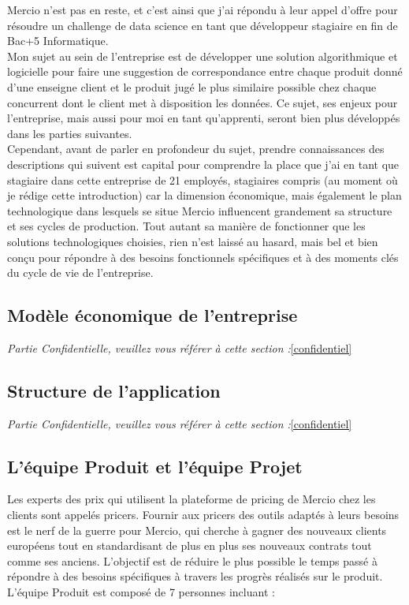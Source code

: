 \documentclass{rapportCS}
\begin{document}
Mercio n'est pas en reste, et c'est ainsi que j'ai répondu à leur appel
d'offre pour résoudre un challenge de data science en tant que développeur stagiaire en fin de 
Bac+5 Informatique.\\
Mon sujet au sein de l'entreprise est de développer une solution algorithmique et logicielle pour 
faire une suggestion de correspondance entre chaque produit donné d'une enseigne client et le 
produit jugé le plus similaire possible chez chaque concurrent 
dont le client met à disposition les données. 
Ce sujet, ses enjeux pour l'entreprise, mais aussi pour moi en tant qu'apprenti,
seront bien plus développés dans les parties suivantes.\\
Cependant, avant de parler en profondeur du sujet, prendre connaissances des descriptions qui
suivent est capital pour comprendre la place que j'ai en tant que stagiaire dans cette 
entreprise de 21 employés, stagiaires compris (au moment où je rédige cette introduction) car la
dimension économique, mais également le plan technologique dans lesquels se situe Mercio influencent 
grandement sa structure et ses cycles de production. Tout autant sa manière de fonctionner que les 
solutions technologiques choisies, rien n'est laissé au hasard, mais bel et bien conçu pour 
répondre à des besoins fonctionnels spécifiques et à des moments clés du cycle de vie de 
l'entreprise.

\subsection{Modèle économique de l'entreprise}
\emph{Partie Confidentielle, veuillez vous référer à cette section :}\ref{confidentiel}

\subsection{Structure de l'application}
\emph{Partie Confidentielle, veuillez vous référer à cette section :}\ref{confidentiel}

\subsection{L'équipe Produit et l'équipe Projet}
Les experts des prix qui utilisent la plateforme de pricing de Mercio chez les clients sont appelés 
pricers. Fournir aux pricers des outils adaptés à leurs besoins est le nerf de la guerre pour 
Mercio, qui cherche à gagner des nouveaux clients européens tout en standardisant de plus 
en plus ses nouveaux contrats tout comme ses anciens. 
L'objectif est de réduire le plus possible le temps passé à répondre à des besoins spécifiques 
à travers les progrès réalisés sur le produit.\\
L'équipe Produit est composé de 7 personnes incluant :\\
\end{document}
